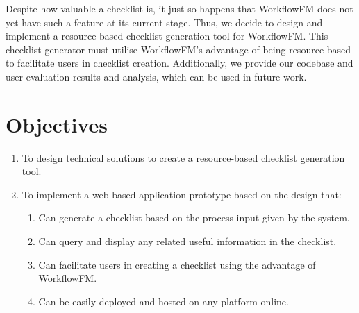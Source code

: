 Despite how valuable a checklist is, it just so happens that WorkflowFM does not yet have such a feature at its current stage. Thus, we decide to design and implement a resource-based checklist generation tool for WorkflowFM.
This checklist generator must utilise WorkflowFM's advantage of being resource-based to facilitate users in checklist creation. Additionally, we provide our codebase and user evaluation results and analysis, which can be used in future work.







\section{Objectives}
\begin{enumerate}
    \item To design technical solutions to create a resource-based checklist generation tool.
    \item To implement a web-based application prototype based on the design that:
    \begin{enumerate}
        \item Can generate a checklist based on the process input given by the system.
        \item Can query and display any related useful information in the checklist.
        \item Can facilitate users in creating a checklist using the advantage of WorkflowFM.
        \item Can be easily deployed and hosted on any platform online.
    \end{enumerate}
\end{enumerate}


